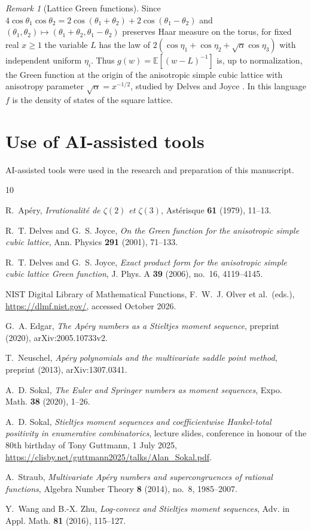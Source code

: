 \documentclass[11pt]{amsart}
\numberwithin{equation}{section}
\theoremstyle{definition}
\theoremstyle{remark}
\newtheorem{remark}[theorem]{Remark}
\newcommand{\E}{\mathbb{E}}
\begin{document}
\begin{remark}[Lattice Green functions]
Since $4\cos\theta_1\cos\theta_2=2\cos(\theta_1+\theta_2)+2\cos(\theta_1-\theta_2)$
and $(\theta_1,\theta_2)\mapsto(\theta_1+\theta_2,\theta_1-\theta_2)$ preserves
Haar measure on the torus, for fixed real $x\ge1$ the variable $L$ has the law of
$2(\cos\eta_1+\cos\eta_2+\sqrt\alpha\cos\eta_3)$ with independent uniform
$\eta_i$. Thus $g(w)=\E[(w-L)^{-1}]$ is, up to normalization, the Green
function at the origin of the anisotropic simple cubic lattice with
anisotropy parameter $\sqrt\alpha=x^{-1/2}$, studied by Delves and Joyce
\cite{DJ01,DJ06}. In this language $f$ is the density of states of the square
lattice.
\end{remark}

\section*{Use of AI-assisted tools}
AI-assisted tools were used in the research and preparation of this manuscript.

\begin{thebibliography}{10}

R.~Ap\'ery, \emph{Irrationalit\'e de $\zeta(2)$ et $\zeta(3)$},
Ast\'erisque \textbf{61} (1979), 11--13.

R.~T. Delves and G.~S. Joyce, \emph{On the Green function for the anisotropic
simple cubic lattice}, Ann. Physics \textbf{291} (2001), 71--133.

R.~T. Delves and G.~S. Joyce, \emph{Exact product form for the anisotropic
simple cubic lattice Green function}, J. Phys. A \textbf{39} (2006), no.~16,
4119--4145.

NIST Digital Library of Mathematical Functions, F.~W.~J. Olver et al.\
(eds.), \url{https://dlmf.nist.gov/}, accessed October 2026.

G.~A. Edgar, \emph{The Ap\'ery numbers as a Stieltjes moment sequence},
preprint (2020), arXiv:2005.10733v2.

T.~Neuschel, \emph{Ap\'ery polynomials and the multivariate saddle point
method}, preprint (2013), arXiv:1307.0341.

A.~D. Sokal, \emph{The Euler and Springer numbers as moment sequences},
Expo. Math. \textbf{38} (2020), 1--26.

A.~D. Sokal, \emph{Stieltjes moment sequences and coefficientwise
Hankel-total positivity in enumerative combinatorics}, lecture slides,
conference in honour of the 80th birthday of Tony Guttmann, 1 July 2025,
\url{https://clisby.net/guttmann2025/talks/Alan_Sokal.pdf}.

A.~Straub, \emph{Multivariate Ap\'ery numbers and supercongruences of
rational functions}, Algebra Number Theory \textbf{8} (2014), no.~8,
1985--2007.

Y.~Wang and B.-X. Zhu, \emph{Log-convex and Stieltjes moment sequences},
Adv. in Appl. Math. \textbf{81} (2016), 115--127.

\end{thebibliography}
\end{document}
